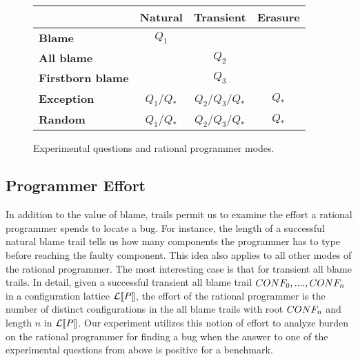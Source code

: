 \begin{figure}
\center
{\begin{tabular}[ht]{l|c|c|c}
                        & {\bf Natural}        & {\bf Transient}          & {\bf Erasure} \\ \hline 
{\bf Blame}             &       $Q_1$          &                          &               \\
{\bf All blame}         &                      &     $Q_2$                &               \\
{\bf Firstborn blame}   &                      &     $Q_3$                &               \\
{\bf Exception}         &       $Q_1$/$Q_*$    &     $Q_2$/$Q_3$/$Q_*$    &      $Q_*$    \\
{\bf Random}            &       $Q_1$/$Q_*$    &     $Q_2$/$Q_3$/$Q_*$    &      $Q_*$    \\
\end{tabular}}
  \caption{ Experimental questions and rational programmer modes.}
  \label{fig:experiment-outline}
\end{figure}


\subsection{Programmer Effort}

In addition to the value of blame, trails permit us to examine the effort a
rational programmer spends to locate a bug.  For instance, the length of a
successful natural blame trail tells us how many components the programmer has
to type before reaching the faulty component. This idea also applies to all
other modes of the rational programmer. The most interesting case is that for
transient all blame trails.  In detail, given a successful transient all blame
trail $CONF_0, ...., CONF_n$ in a configuration lattice $\mathcal{L}\llbracket P\rrbracket$,
the effort of the rational programmer is the number of distinct configurations
in the all blame trails with root $CONF_n$ and length $n$ in
$\mathcal{L}\llbracket P\rrbracket$. Our experiment utilizes this notion of effort to analyze
burden on the rational programmer for finding a bug when the answer to one of
the experimental questions from above is positive for a benchmark.

